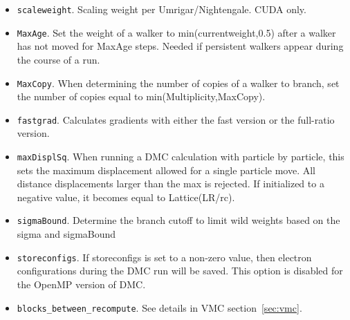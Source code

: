 \begin{itemize}
\item \texttt{scaleweight}. Scaling weight per Umrigar/Nightengale.  CUDA only.

\item \texttt{MaxAge}. Set the weight of a walker to min(currentweight,0.5) after a walker has not moved for MaxAge steps.  Needed if persistent walkers appear during the course of a run.

\item \texttt{MaxCopy}. When determining the number of copies of a walker to branch, set the number of copies equal to min(Multiplicity,MaxCopy).

\item \texttt{fastgrad}. Calculates gradients with either the fast version or the full-ratio version.

\item \texttt{maxDisplSq}.  When running a DMC calculation with particle by particle, this sets the maximum displacement allowed for a single particle move.  All distance displacements larger than the max is rejected.  If initialized to a negative value, it becomes equal to Lattice(LR/rc).

\item \texttt{sigmaBound}.  Determine the branch cutoff to limit wild weights based on the sigma and sigmaBound


\item \texttt{storeconfigs}. If storeconfigs is set to a non-zero value, then electron configurations during the DMC run will be saved. This option is disabled for the OpenMP version of DMC.

\item \texttt{blocks\_between\_recompute}. See details in VMC section~\ref{sec:vmc}.





\end{itemize}
